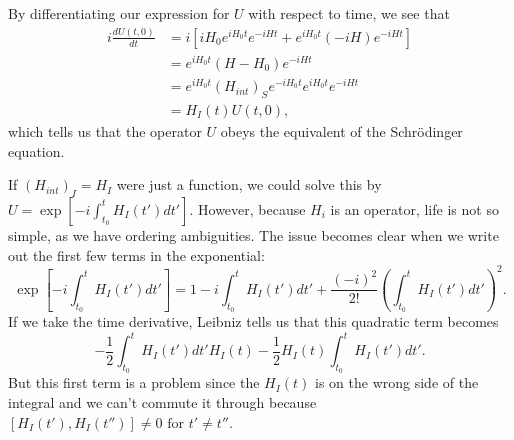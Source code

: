 By differentiating our expression for $U$ with respect to time, we see that
\begin{align*}
    i\frac{dU(t,0)}{dt} &= 
        i\left[iH_0 e^{iH_0 t}e^{-iHt}+e^{iH_0t}(-iH) e^{-iHt}\right]\\
    &= e^{iH_0t} (H-H_0)e^{-iHt}\\
    &= e^{iH_0t} (H_{int})_S e^{-iH_0t} e^{iH_0t} e^{-iHt}\\
    &= H_I(t) U(t,0),
\end{align*}
which tells us that the operator $U$ obeys the equivalent of the Schr\"odinger equation.

If $(H_{int})_I=H_I$ were just a function, we could solve this by $U=\exp[-i \int_{t_0}^t H_I(t')dt'].$ However, because $H_i$ is an operator, life is not so simple, as we have ordering ambiguities. The issue becomes clear when we write out the first few terms in the exponential:
\begin{equation}
    \exp[-i \int_{t_0}^t H_I(t')dt']=1-i \int_{t_0}^t H_I(t')dt'+\frac{(-i)^2}{2!}\left(\int_{t_0}^t H_I(t')dt'\right)^2.
\end{equation}
If we take the time derivative, Leibniz tells us that this quadratic term becomes
\begin{equation}
    -\frac{1}{2}\int_{t_0}^t H_I(t')dt' H_I(t)-\frac{1}{2} H_I(t) \int_{t_0}^t H_I(t')dt'.
\end{equation}
But this first term is a problem since the $H_I(t)$ is on the wrong side of the integral and we can't commute it through because $[H_I(t'),H_I(t'')]\neq 0 \text{ for }t'\neq t''$.

